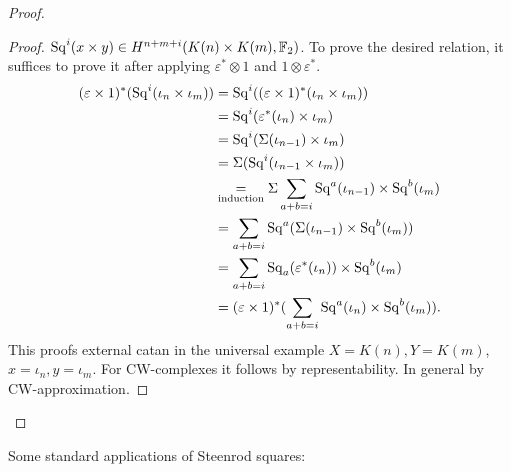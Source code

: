 \documentclass[language=english]{TemplateLecture}
\begin{document}
\begin{proof}
\begin{enumerate}
\begin{proof}
            \(\mathrm{Sq}^i(x\times y)\in H^{n+m+i}(K(n)\times K(m), \mathbb{F}_2)\). To prove the desired relation, it suffices to prove it after applying \(\varepsilon^*\otimes 1\) and \(1\otimes \varepsilon^*\).
            \[\begin{split}
                (\varepsilon\times 1)^*(\mathrm{Sq}^i(\iota_n\times \iota_m)) &= \mathrm{Sq}^i((\varepsilon\times 1)^*(\iota_n\times \iota_m)) \\
                &= \mathrm{Sq}^i(\varepsilon^*(\iota_n)\times \iota_m) \\
                &= \mathrm{Sq}^i(\Sigma (\iota_{n-1})\times \iota_m) \\
                &= \Sigma(\mathrm{Sq}^i(\iota_{n-1}\times \iota_m)) \\
                &\underset{\text{induction}}{=} \Sigma \sum_{a+b = i}\mathrm{Sq}^a(\iota_{n-1})\times \mathrm{Sq}^b(\iota_m) \\
                &= \sum_{a+b = i}\mathrm{Sq}^a(\Sigma (\iota_{n-1})\times \mathrm{Sq}^b(\iota_m)) \\
                &= \sum_{a+b = i} \mathrm{Sq}_a(\varepsilon^*(\iota_n))\times \mathrm{Sq}^b(\iota_m) \\
                &= (\varepsilon\times 1)^* (\sum_{a+b= i} \mathrm{Sq}^a(\iota_n)\times \mathrm{Sq}^b(\iota_m)). 
            \end{split}\]
            This proofs external catan in the universal example \(X = K(n), Y = K(m)\), \(x = \iota_n, y = \iota_m\). For CW-complexes it follows by representability. In general by CW-approximation.
        \end{proof}
    \end{enumerate}
\end{proof}


Some standard applications of Steenrod squares:
\end{document}
